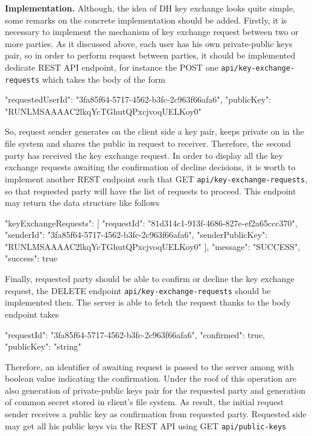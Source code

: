 \textbf{Implementation.} Although, the idea of DH key exchange looks quite simple, some remarks on the concrete
implementation should be added.
Firstly, it is necessary to implement the mechanism of key exchange request between two or more parties.
As it discussed above, each user has his own private-public keys pair, so in order to perform request between parties,
it should be implemented dedicate REST API endpoint, for instance the POST one \texttt{api/key-exchange-requests} which
takes the body of the form
\begin{spverbatim}
{
    "requestedUserId": "3fa85f64-5717-4562-b3fc-2c963f66afa6",
    "publicKey": "RUNLMSAAAAC2lkqYcTGhutQPxcjvoqUELKoy0"
}
\end{spverbatim}
So, request sender generates on the client side a key pair, keeps private on in the file system and shares the public
in request to receiver.
Therefore, the second party has received the key exchange request.
In order to display all the key exchange requests awaiting the confirmation of decline decisions, it is worth to implement
another REST endpoint such that GET \texttt{api/key-exchange-requests}, so that requested party will have the list of
requests to proceed.
This endpoint may return the data structure like follows
\begin{spverbatim}
{
    "keyExchangeRequests": [
        {
            "requestId": "81d314c1-913f-4686-827e-ef2a65ccc370",
            "senderId": "3fa85f64-5717-4562-b3fc-2c963f66afa6",
            "senderPublicKey": "RUNLMSAAAAC2lkqYcTGhutQPxcjvoqUELKoy0"
        }
    ],
    "message": "SUCCESS",
    "success": true
}
\end{spverbatim}
Finally, requested party should be able to confirm or decline the key exchange request, the DELETE endpoint
\texttt{api/key-exchange-requests} should be implemented then.
The server is able to fetch the request thanks to the body endpoint takes
\begin{spverbatim}
{
    "requestId": "3fa85f64-5717-4562-b3fc-2c963f66afa6",
    "confirmed": true,
    "publicKey": "string"
}
\end{spverbatim}
Therefore, an identifier of awaiting request is passed to the server among with boolean value
indicating the confirmation.
Under the roof of this operation are also generation of private-public keys pair for the requested party and
generation of common secret stored in client's file system.
As result, the initial request sender receives a public key as confirmation from requested party.
Requested side may get all his public keys via the REST API using GET \texttt{api/public-keys}
